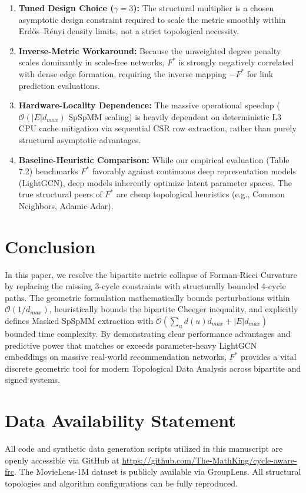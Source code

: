 \documentclass{siuro250211}
\theoremstyle{remark}
\theoremstyle{plain}
\begin{document}
\begin{enumerate}
    \item \textbf{Tuned Design Choice ($\gamma=3$):} The structural multiplier is a chosen asymptotic design constraint required to scale the metric smoothly within Erdős–Rényi density limits, not a strict topological necessity.
    \item \textbf{Inverse-Metric Workaround:} Because the unweighted degree penalty scales dominantly in scale-free networks, $F^*$ is strongly negatively correlated with dense edge formation, requiring the inverse mapping $-F^*$ for link prediction evaluations.
    \item \textbf{Hardware-Locality Dependence:} The massive operational speedup ($\mathcal{O}(|E|d_{max})$ SpSpMM scaling) is heavily dependent on deterministic L3 CPU cache mitigation via sequential CSR row extraction, rather than purely structural asymptotic advantages.
    \item \textbf{Baseline-Heuristic Comparison:} While our empirical evaluation (Table 7.2) benchmarks $F^*$ favorably against continuous deep representation models (LightGCN), deep models inherently optimize latent parameter spaces. The true structural peers of $F^*$ are cheap topological heuristics (e.g., Common Neighbors, Adamic-Adar).
\end{enumerate}

\section{Conclusion}
In this paper, we resolve the bipartite metric collapse of Forman-Ricci Curvature by replacing the missing 3-cycle constraints with structurally bounded 4-cycle paths. The geometric formulation mathematically bounds perturbations within $\mathcal{O}(1/d_{max})$, heuristically bounds the bipartite Cheeger inequality, and explicitly defines Masked SpSpMM extraction with $\mathcal{O}(\sum_u d(u) d_{max} + |E| d_{max})$ bounded time complexity. By demonstrating clear performance advantages and predictive power that matches or exceeds parameter-heavy LightGCN embeddings on massive real-world recommendation networks, $F^*$ provides a vital discrete geometric tool for modern Topological Data Analysis across bipartite and signed systems.

\section*{Data Availability Statement}
All code and synthetic data generation scripts utilized in this manuscript are openly accessible via GitHub at \url{https://github.com/The-MathKing/cycle-aware-frc}. The MovieLens-1M dataset is publicly available via GroupLens. All structural topologies and algorithm configurations can be fully reproduced.
\end{document}
